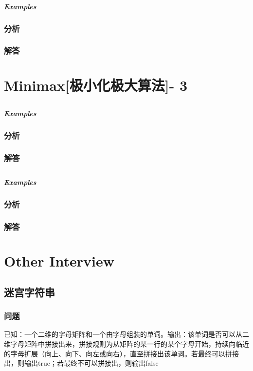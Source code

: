 \documentclass[UTF8,a4paper,12pt]{ctexbook}
\begin{document}
		\subparagraph{Examples}
	
		\subsubsection{分析}
	
		\subsubsection{解答}
		
\section{Minimax[极小化极大算法]- 3}
	\subsection{}
	
		\subparagraph{Examples}
		
		\subsubsection{分析}
		
		\subsubsection{解答}
	\subsection{}
		
		\subparagraph{Examples}
		
		\subsubsection{分析}
		
		\subsubsection{解答}

\section{Other Interview}
\subsection{迷宫字符串} 
	\subsubsection{问题}
	已知：一个二维的字母矩阵和一个由字母组装的单词。输出：该单词是否可以从二维字母矩阵中拼接出来，拼接规则为从矩阵的某一行的某个字母开始，持续向临近的字母扩展（向上、向下、向左或向右），直至拼接出该单词。若最终可以拼接出，则输出true；若最终不可以拼接出，则输出false
	
\end{document}
